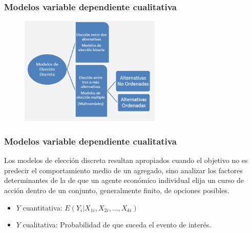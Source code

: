 \documentclass[10pt]{beamer}
\begin{document}
\begin{frame}
\frametitle{Modelos variable dependiente cualitativa}


\begin{figure}
\begin{center}
    \includegraphics[width=0.6\textwidth]{9_1.JPG}
\end{center}
\end{figure}

\end{frame}






\begin{frame}
\frametitle{Modelos variable dependiente cualitativa}


Los modelos de elección discreta resultan apropiados cuando el objetivo no es predecir el comportamiento medio de un agregado, sino analizar los factores determinantes de la  de que un agente económico individual elija un curso de acción dentro de un conjunto, generalmente finito, de opciones posibles. 

\vspace{4mm}
\begin{itemize}
\item $Y$ cuantitativa: $E(Y_i | X_{1i}, X_{2i}, ..., X_{ki} )$

\vspace{3mm}

\item $Y$ cualitativa: Probabilidad de que suceda el evento de interés.

\end{itemize}


\end{frame}


\end{document}
